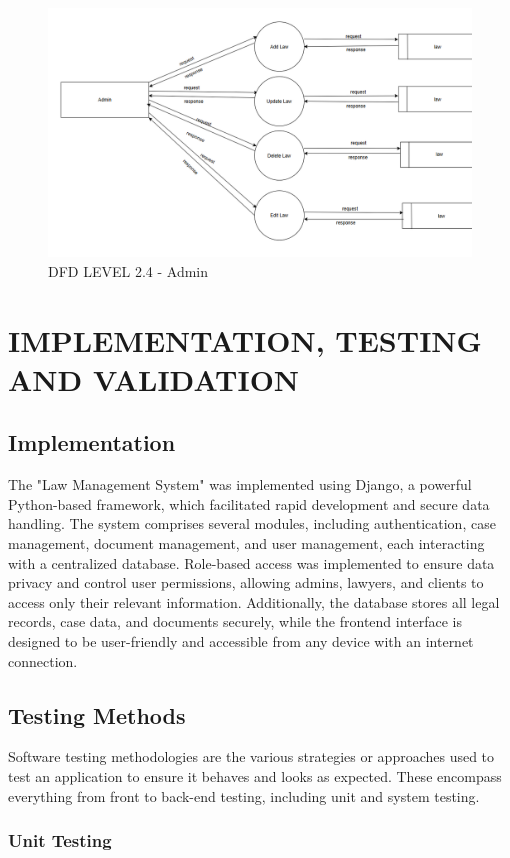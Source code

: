 \begin{figure}
  \centering
  \includegraphics[width=0.8\linewidth]{Admin2.4law.png}
 \caption{DFD LEVEL 2.4 - Admin}
   \label{fig:DFD LEVEL 2.4 - Admin}
\end{figure}
%
\chapter{IMPLEMENTATION, TESTING AND VALIDATION}
%
\section{Implementation}

The "Law Management System" was implemented using Django, a powerful Python-based framework, which facilitated rapid development and secure data handling. The system comprises several modules, including authentication, case management, document management, and user management, each interacting with a centralized database. Role-based access was implemented to ensure data privacy and control user permissions, allowing admins, lawyers, and clients to access only their relevant information. Additionally, the database stores all legal records, case data, and documents securely, while the frontend interface is designed to be user-friendly and accessible from any device with an internet connection.
\section{Testing Methods}

Software testing methodologies are the various strategies or approaches used to test an application to ensure it behaves and looks as expected. These encompass everything from front to back-end testing, including unit and system testing.

\subsection{Unit Testing}

